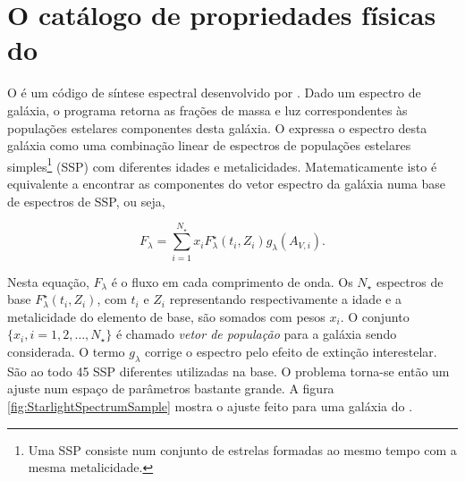 \section{O catálogo de propriedades físicas do \STARLIGHT}
\label{sec:Intro:Starlight}

O \starlight é um código de síntese espectral desenvolvido por
\citet{CidFernandes2005}. Dado um espectro de galáxia, o programa retorna as
frações de massa e luz correspondentes às populações estelares componentes desta
galáxia. O \starlight expressa o espectro desta galáxia como uma combinação
linear de espectros de populações estelares simples\footnote{Uma SSP consiste
num conjunto de estrelas formadas ao mesmo tempo com a mesma metalicidade.}
(SSP) com diferentes idades e metalicidades. Matematicamente isto é equivalente
a encontrar as componentes do vetor espectro da galáxia numa base de espectros
de SSP, ou seja,

\begin{equation*}
F_\lambda = \sum_{i=1}^{N_\star} x_i F^\star_\lambda(t_i,Z_i)
g_\lambda(A_{V,i}).
\end{equation*}

Nesta equação, $F_\lambda$ é o fluxo em cada comprimento de onda. Os $N_\star$
espectros de base $F^\star_\lambda(t_i, Z_i)$, com $t_i$ e $Z_i$ representando
respectivamente a idade e a metalicidade do elemento de base, são somados com
pesos $x_i$. O conjunto $\{x_i, i=1,2,\ldots,N_\star\}$ é chamado {\em vetor de
população} para a galáxia sendo considerada. O termo $g_\lambda$ corrige o
espectro pelo efeito de extinção interestelar. São ao todo 45 SSP diferentes
utilizadas na base. O problema torna-se então um ajuste num espaço de parâmetros
bastante grande. A figura \ref{fig:StarlightSpectrumSample} mostra o ajuste
feito para uma galáxia do \SDSS.

